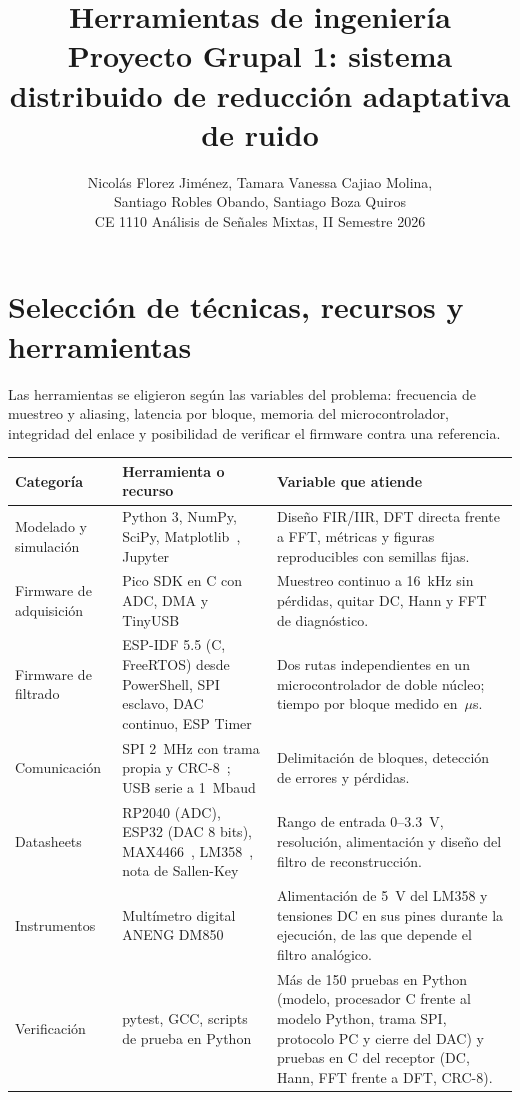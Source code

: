 \documentclass[10pt,a4paper]{article}
\title{\vspace{-1.5cm}Herramientas de ingeniería\\\large Proyecto Grupal 1: sistema distribuido de reducción adaptativa de ruido}
\author{Nicolás Florez Jiménez, Tamara Vanessa Cajiao Molina,\\Santiago Robles Obando, Santiago Boza Quiros\\CE 1110 Análisis de Señales Mixtas, II Semestre 2026}
\date{\vspace{-8mm}}
\begin{document}
\maketitle

\section{Selección de técnicas, recursos y herramientas}
Las herramientas se eligieron según las variables del problema: frecuencia de muestreo y
aliasing, latencia por bloque, memoria del microcontrolador, integridad del enlace y
posibilidad de verificar el firmware contra una referencia.

\noindent\small
\begin{tabularx}{\linewidth}{@{}>{\raggedright\arraybackslash}p{3.2cm}>{\raggedright\arraybackslash}p{3.6cm}>{\raggedright\arraybackslash}X@{}}
\toprule
Categoría & Herramienta o recurso & Variable que atiende \\
\midrule
Modelado y simulación & Python 3, NumPy, SciPy, Matplotlib~\cite{numpy,scipy}, Jupyter & Diseño FIR/IIR, DFT directa frente a FFT, métricas y figuras reproducibles con semillas fijas. \\
Firmware de adquisición & Pico SDK en C con ADC, DMA y TinyUSB~\cite{picosdk,rp2040} & Muestreo continuo a 16~kHz sin pérdidas, quitar DC, Hann y FFT de diagnóstico. \\
Firmware de filtrado & ESP-IDF 5.5 (C, FreeRTOS) desde PowerShell, SPI esclavo, DAC continuo, ESP Timer~\cite{espidf,esp32} & Dos rutas independientes en un microcontrolador de doble núcleo; tiempo por bloque medido en~$\mu$s. \\
Comunicación & SPI 2~MHz con trama propia y CRC-8~\cite{peterson}; USB serie a 1~Mbaud & Delimitación de bloques, detección de errores y pérdidas. \\
Datasheets & RP2040 (ADC), ESP32 (DAC 8 bits), MAX4466~\cite{max4466}, LM358~\cite{lm358}, nota de Sallen-Key~\cite{sloa024} & Rango de entrada 0--3.3~V, resolución, alimentación y diseño del filtro de reconstrucción. \\
Instrumentos & Multímetro digital ANENG DM850 & Alimentación de 5~V del LM358 y tensiones DC en sus pines durante la ejecución, de las que depende el filtro analógico. \\
Verificación & pytest, GCC, scripts de prueba en Python & Más de 150 pruebas en Python (modelo, procesador C frente al modelo Python, trama SPI, protocolo PC y cierre del DAC) y pruebas en C del receptor (DC, Hann, FFT frente a DFT, CRC-8). \\

\end{tabularx}
\end{document}
